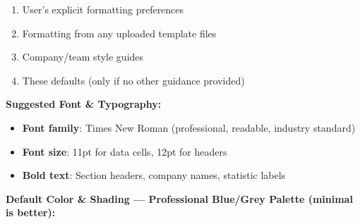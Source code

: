 \documentclass[11pt]{article}
\begin{document}
\begin{enumerate}[leftmargin=*,itemsep=2pt,topsep=2pt]
\item {} User's explicit formatting preferences
\item {} Formatting from any uploaded template files
\item {} Company/team style guides
\item {} These defaults (only if no other guidance provided)
\end{enumerate}

\textbf{Suggested Font \& Typography:}

\begin{itemize}[leftmargin=*,itemsep=2pt,topsep=2pt]
\item {} \textbf{Font family}: Times New Roman (professional, readable, industry standard)
\item {} \textbf{Font size}: 11pt for data cells, 12pt for headers
\item {} \textbf{Bold text}: Section headers, company names, statistic labels
\end{itemize}

\textbf{Default Color \& Shading — Professional Blue/Grey Palette (minimal is better):}
\end{document}
